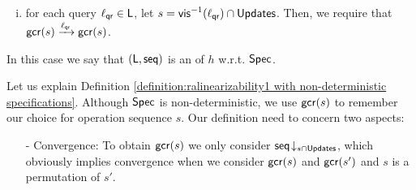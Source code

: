 {\begin{definition}
\begin{enumerate}[(i)]
$$ \gconfres(s)=\left\{
\begin{aligned}
an \ element \ of \ S &  & If \ S = \{ \abstate \vert \abstate_0 \xrightarrow{ \aseqord\!\downarrow_{s\cap \updates} }^* \abstate \} \neq \emptyset \\
undefined & & Otherwise
\end{aligned}
\right.
$$


Moreover, we require function $\gconfres$ to satisfy a property called $\mathsf{ConsistentChoice}$:

\begin{itemize}
\setlength{\itemsep}{0.5pt}
\item[-] $\mathsf{ConsistentChoice}$: Given two sub-sequences $s_1,s_2$, such that $s_1$ and $s_2$ are both consistent with $\avisord{}$, $s_1$ and $s_2$ are both closed under $\avisord{}^{-1}$, and $s_1$ is a sub-sequence of $s_2$. Then, $\gconfres(s_1) \xrightarrow{ s_2 - s_1 }^* \gconfres(s_2)$, where $s_2 - s_1$ denotes the sequences obtained from $s_2$ by removing elements of $s_1$.

\end{itemize}

\item for each query $\ell_{\mathsf{qr}}\in \mathsf{L}$, let $s = \mathsf{vis}^{-1}(\ell_{\mathsf{qr}})\cap \mathsf{Updates}$. Then, we require that $\mathsf{gcr}(s) \xrightarrow{ \ell_{\mathsf{qr}} } \mathsf{gcr}(s)$.
\end{enumerate}
In this case we say that $(\mathsf{L}, \mathsf{seq})$ is an \emph{\crdtlinearization{}} of $h$ w.r.t. $\mathsf{Spec}{}$.
\end{definition}

Let us explain Definition \ref{definition:ralinearizability1 with non-deterministic specifications}. Although $\mathsf{Spec}{}$ is non-deterministic, we use $\mathsf{gcr}(s)$ to remember our choice for operation sequence $s$. Our definition need to concern two aspects:

\begin{itemize}
\setlength{\itemsep}{0.5pt}
\item[-] Convergence: To obtain $\mathsf{gcr}(s)$ we only consider $\mathsf{seq}\!\downarrow_{s\cap \mathsf{Updates}}$, which obviously implies convergence when we consider $\mathsf{gcr}(s)$ and $\mathsf{gcr}(s')$ and $s$ is a permutation of $s'$.


\end{itemize}}
